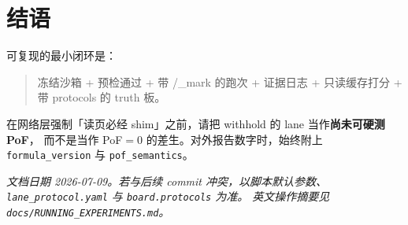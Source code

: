 \documentclass[10.5pt,a4paper]{article}
\begin{document}
\section{结语}

可复现的最小闭环是：

\begin{quote}
冻结沙箱 + 预检通过 + 带 /\_mark 的跑次 + 证据日志 + 只读缓存打分 + 带 protocols 的 truth 板。
\end{quote}

在网络层强制「读页必经 shim」之前，请把 withhold 的 lane 当作\textbf{尚未可硬测 PoF}，
而不是当作 PoF$=0$ 的差生。对外报告数字时，始终附上 \texttt{formula\_version} 与 \texttt{pof\_semantics}。

\vspace{1em}
\noindent\textit{文档日期 2026-07-09。若与后续 commit 冲突，以脚本默认参数、
\texttt{lane\_protocol.yaml} 与 \texttt{board.protocols} 为准。
英文操作摘要见 \texttt{docs/RUNNING\_EXPERIMENTS.md}。}
\end{document}
